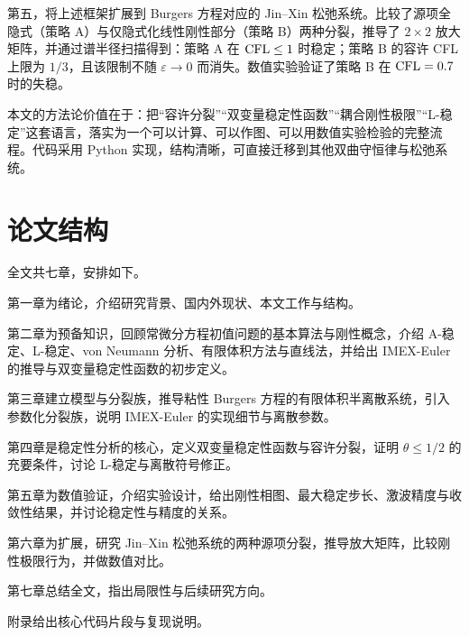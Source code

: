 第五，将上述框架扩展到 Burgers 方程对应的 Jin--Xin 松弛系统。比较了源项全隐式（策略 A）与仅隐式化线性刚性部分（策略 B）两种分裂，推导了 $2\times2$ 放大矩阵，并通过谱半径扫描得到：策略 A 在 $\mathrm{CFL}\le1$ 时稳定；策略 B 的容许 CFL 上限为 $1/3$，且该限制不随 $\varepsilon\to0$ 而消失。数值实验验证了策略 B 在 $\mathrm{CFL}=0.7$ 时的失稳。

本文的方法论价值在于：把“容许分裂”“双变量稳定性函数”“耦合刚性极限”“L-稳定”这套语言，落实为一个可以计算、可以作图、可以用数值实验检验的完整流程。代码采用 Python 实现，结构清晰，可直接迁移到其他双曲守恒律与松弛系统。

\section{论文结构}

全文共七章，安排如下。

第一章为绪论，介绍研究背景、国内外现状、本文工作与结构。

第二章为预备知识，回顾常微分方程初值问题的基本算法与刚性概念，介绍 A-稳定、L-稳定、von Neumann 分析、有限体积方法与直线法，并给出 IMEX-Euler 的推导与双变量稳定性函数的初步定义。

第三章建立模型与分裂族，推导粘性 Burgers 方程的有限体积半离散系统，引入参数化分裂族，说明 IMEX-Euler 的实现细节与离散参数。

第四章是稳定性分析的核心，定义双变量稳定性函数与容许分裂，证明 $\theta\le1/2$ 的充要条件，讨论 L-稳定与离散符号修正。

第五章为数值验证，介绍实验设计，给出刚性相图、最大稳定步长、激波精度与收敛性结果，并讨论稳定性与精度的关系。

第六章为扩展，研究 Jin--Xin 松弛系统的两种源项分裂，推导放大矩阵，比较刚性极限行为，并做数值对比。

第七章总结全文，指出局限性与后续研究方向。

附录给出核心代码片段与复现说明。
